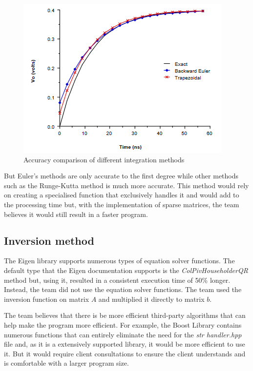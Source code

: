 \documentclass[12pt,a4paper]{article}
\begin{document}
\begin{figure} [h!]
	\centering
	\includegraphics[]{Integration.PNG}
	\caption{Accuracy comparison of different integration methods \cite{integration}}
\end{figure}
\par
But Euler's methods are only accurate to the first degree while other methods such as the Runge-Kutta method is much more accurate.
This method would rely on creating a specialised function that exclusively handles it and would add to the processing time but,
with the implementation of sparse matrices, the team believes it would still result in a faster program.

\subsection{Inversion method}
The Eigen library supports numerous types of equation solver functions. The default type that the Eigen documentation supports is the 
\textit{ColPivHouseholderQR} method but, using it, resulted in a consistent execution time of 50\% longer. Instead, the team 
did not use the equation solver functions. The team used the inversion function on matrix $A$ and multiplied it directly to matrix $b$.
\par 
The team believes that there is be more efficient third-party algorithms that can help make the program more efficient. For example, 
the Boost Library contains numerous functions that can entirely eliminate the need for the \textit{str handler.hpp} file and,
as it is a extensively supported library, it would be more efficient to use it. But it would require client consultations to ensure
the client understands and is comfortable with a larger program size. 
\end{document}
